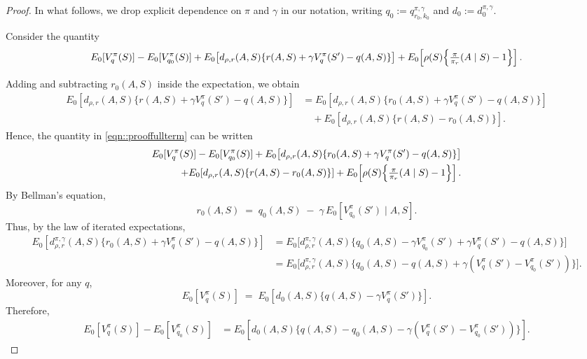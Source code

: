 \documentclass[11pt]{article}
\theoremstyle{plain}
\begin{document}
\begin{proof}
    In what follows, we drop explicit dependence on $\pi$ and $\gamma$ in our notation, writing
    $q_{0} := q_{r_0,k_0}^{\pi,\gamma}$ and $d_0 := d_0^{\pi,\gamma}$. 
 


Consider the quantity
\begin{equation}
\label{eqn::prooffullterm}
E_0[V_q^\pi(S)] - E_0[V_{q_0}^\pi(S)] 
+ E_0\!\left[d_{\rho,r}(A,S)\{r(A,S) + \gamma V_q^\pi(S') - q(A,S)\}\right]  
+ E_0\!\left[\rho(S)\Bigl\{\tfrac{\pi}{\pi_r}(A \mid S) - 1\Bigr\}\right].
\end{equation}

Adding and subtracting $r_0(A,S)$ inside the expectation, we obtain
\begin{align*} 
E_0\!\left[d_{\rho,r}(A,S)\{r(A,S) + \gamma V_q^\pi(S') - q(A,S)\}\right] 
&= E_0\!\left[d_{\rho,r}(A,S)\{r_0(A,S) + \gamma V_q^\pi(S') - q(A,S)\}\right] \\
&\quad + E_0\!\left[d_{\rho,r}(A,S)\{r(A,S) - r_0(A,S)\}\right].
\end{align*}
Hence, the quantity in \eqref{eqn::prooffullterm} can be written
\begin{equation}
\label{eqn::prooffullterm2}
\begin{aligned}
E_0[V_q^\pi(S)] - E_0[V_{q_0}^\pi(S)] 
+ E_0\!\left[d_{\rho,r}(A,S)\{r_0(A,S) + \gamma V_q^\pi(S') - q(A,S)\}\right] 
\\ + E_0\!\left[d_{\rho,r}(A,S)\{r(A,S) - r_0(A,S)\}\right] 
+ E_0\!\left[\rho(S)\Bigl\{\tfrac{\pi}{\pi_r}(A \mid S) - 1\Bigr\}\right].
\end{aligned}
\end{equation}
By Bellman’s equation,
\[
r_0(A,S) \;=\; q_0(A,S) \;-\; \gamma\,E_0\!\left[V_{q_0}^\pi(S') \mid A,S\right].
\]
Thus, by the law of iterated expectations, 
\begin{align*}
E_0\!\left[d_{\rho,r}^{\pi,\gamma}(A,S)\{r_0(A,S) + \gamma V_q^\pi(S') - q(A,S)\}\right] 
&= E_0\!\Big[d_{\rho,r}^{\pi,\gamma}(A,S)\{q_0(A,S) - \gamma V_{q_0}^\pi(S') + \gamma V_q^\pi(S') - q(A,S)\}\Big] \\
&= E_0\!\Big[d_{\rho,r}^{\pi,\gamma}(A,S)\{q_0(A,S) - q(A,S) + \gamma (V_q^\pi(S') - V_{q_0}^\pi(S'))\}\Big].
\end{align*}
Moreover, for any $q$,
\[
E_0[V_q^\pi(S)] \;=\; E_0\!\left[d_0(A,S)\{q(A,S) - \gamma V_q^\pi(S')\}\right].
\]
Therefore,
\begin{align*}
E_0[V_q^\pi(S)] - E_0[V_{q_0}^\pi(S)]
&= E_0\!\left[d_0(A,S)\{q(A,S) - q_0(A,S) - \gamma (V_q^\pi(S') - V_{q_0}^\pi(S'))\}\right].

\end{align*}
\end{proof}
\end{document}
